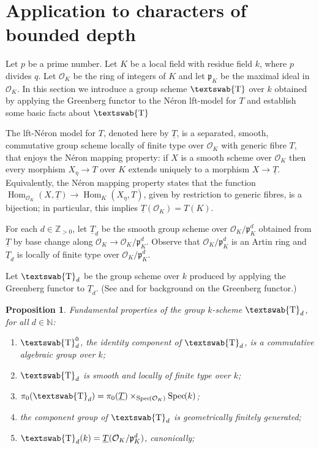 \documentclass[11pt]{amsart}
\makeatletter
\newcommand{\mathswab}[1]{\operatorname{\textswab{#1}}}
\theoremstyle{plain}
\newtheorem{proposition}[theorem]{Proposition}
\theoremstyle{definition}
\theoremstyle{remark}
\newcommand{\Spec}[1]{{\operatorname{Spec}\hskip-1pt( #1 )}}
\newcommand{\ZZ}{{\mathbb{Z}}}
\newcommand{\NN}{{\mathbb{N}}}
\newcommand{\OK}{\mathcal{O}_K}
\newcommand{\pK}{\mathfrak{p}_K}
\newcommand{\Fq}{k}
\DeclareMathOperator{\Hom}{Hom}
\newcommand{\GN}[1]{\mathswab{#1}}
\newcommand{\TT}{\underline{T}}
\newcommand{\labitem}[2]{%
\def\@itemlabel{\textbf{#1}}
\item
\def\@currentlabel{#1}\label{#2}}
\makeatother
\begin{document}
\section{Application to characters of bounded depth}

%
Let $p$ be a prime number. Let $K$ be a local field with residue field
$\Fq$, where $p$ divides $q$. Let $\OK$ be the ring of integers of $K$
and let $\pK$ be the maximal ideal in $\OK$.
%
In this section we introduce a group scheme $\GN{T}$ over $\Fq$
obtained by applying the Greenberg functor to the N\'eron lft-model
for $T$ and establish some basic facts about $\GN{T}$


The lft-N\'eron model for $T$, denoted here by $\TT$, is a separated,
smooth, commutative group scheme locally of finite type over $\OK$
with generic fibre $T$, that enjoys the N\'eron mapping property: if
$X$ is a smooth scheme over $\OK$ then every morphism $X_\eta \to T$
over $K$ extends uniquely to a morphism $X \to \TT$. Equivalently, the
N\'eron mapping property states that the function
$\Hom_{\OK} (X,\TT) \to \Hom_K(X_\eta,T)$, given by restriction to
generic fibres, is a bijection; in particular, this implies $\TT(\OK) = T(K)$.

For each $d\in \ZZ_{>0}$, let $\TT_{d}$ be the smooth group scheme over
$\OK/\pK^d$ obtained from $\TT$ by base change along $\OK \to
\OK/\pK^d$. Observe that $\OK/\pK^d$ is an Artin ring and
$\TT_{d}$ is locally of finite type over $\OK/\pK^d$.

Let $\GN{T}_{d}$ be the group scheme over $\Fq$ produced by applying
the Greenberg functor to $\TT_{d}$. (See \cite{Greenberg:2} and
\cite[Ch. 9, \S 6]{BLR} for background on the Greenberg functor.)

\begin{proposition}\label{prop:GN}
  Fundamental properties of the group $\Fq$-scheme $\GN{T}_d$, for all $d\in \NN$:
  \begin{enumerate}
  \labitem{(GNd.0)}{GN0} $\GN{T}_d^0$, the identity component of
    $\GN{T}_d$, is a commutative algebraic group over $\Fq$;
  \labitem{(GNd.1)}{GNd} $\GN{T}_d$ is smooth and locally of finite type over $\Fq$;
  \labitem{(GNd.2)}{pi0} $\pi_0(\GN{T}_d) = \pi_0(\TT) \times_{\Spec{\OK}} \Spec{\Fq}$;
  \labitem{(GNd.3)}{fg} the component group of $\GN{T}_d$ is geometrically finitely generated;
  \labitem{(GNd.4)}{dFq} $\GN{T}_d(\Fq) = \TT(\OK/\pK^d)$, canonically;
\end{enumerate}
\end{proposition}
\end{document}
